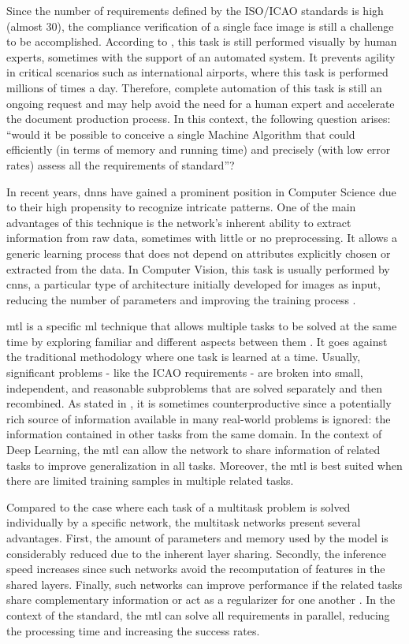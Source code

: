 Since the number of requirements defined by the ISO/ICAO standards is high (almost 30), the compliance verification of a single face image is still a challenge to be accomplished. According to \cite{ferrara2012multi}, this task is still performed visually by human experts, sometimes with the support of an automated system. It prevents agility in critical scenarios such as international airports, where this task is performed millions of times a day. Therefore, complete automation of this task is still an ongoing request and may help avoid the need for a human expert and accelerate the document production process. In this context, the following question arises: ``would it be possible to conceive a single Machine Algorithm that could efficiently (in terms of memory and running time) and precisely (with low error rates) assess all the requirements of \icao standard''?

In recent years, \acfp{dnn} have gained a prominent position in Computer Science due to their high propensity to recognize intricate patterns. One of the main advantages of this technique is the network's inherent ability to extract information from raw data, sometimes with little or no preprocessing. It allows a generic learning process that does not depend on attributes explicitly chosen or extracted from the data. In Computer Vision, this task is usually performed by \acfp{cnn}, a particular type of architecture initially developed for images as input, reducing the number of parameters and improving the training process \citep{goodfellow2016deep}.

\acf{mtl} is a specific \acl{ml} technique that allows multiple tasks to be solved at the same time by exploring familiar and different aspects between them \citep{zhang2017survey}. It goes against the traditional methodology where one task is learned at a time. Usually, significant problems - like the ICAO requirements - are broken into small, independent, and reasonable subproblems that are solved separately and then recombined. As stated in \cite{Caruana1997}, it is sometimes counterproductive since a potentially rich source of information available in many real-world problems is ignored: the information contained in other tasks from the same domain. In the context of Deep Learning, the \acs{mtl} can allow the network to share information of related tasks to improve generalization in all tasks. Moreover, the \acl{mtl} is best suited when there are limited training samples in multiple related tasks.

Compared to the case where each task of a multitask problem is solved individually by a specific network, the multitask networks present several advantages. First, the amount of parameters and memory used by the model is considerably reduced due to the inherent layer sharing. Secondly, the inference speed increases since such networks avoid the recomputation of features in the shared layers. Finally, such networks can improve performance if the related tasks share complementary information or act as a regularizer for one another \citep{vandenhende2021multi}. In the context of the \icao standard, the \acs{mtl} can solve all requirements in parallel, reducing the processing time and increasing the success rates.

